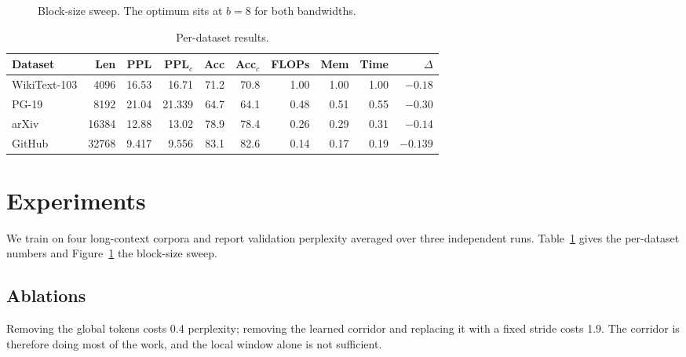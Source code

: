 \documentclass[11pt,twocolumn]{article}
\begin{document}
\begin{figure}[t]
\centering
{}
\caption{Block-size sweep. The optimum sits at $b=8$ for both bandwidths.}
\label{fig:sweep}
\end{figure}

\begin{table}[t]
\centering
\caption{Per-dataset results.}
\label{tab:results}
\begin{tabular}{lrrrrrrrrr}
\toprule
Dataset & Len & PPL & PPL$_c$ & Acc & Acc$_c$ & FLOPs & Mem & Time & $\Delta$ \\
\midrule
WikiText-103 & 4096 & 16.53 & 16.71 & 71.2 & 70.8 & 1.00 & 1.00 & 1.00 & $-0.18$ \\
PG-19        & 8192 & 21.04 & 21.339 & 64.7 & 64.1 & 0.48 & 0.51 & 0.55 & $-0.30$ \\
arXiv        & 16384 & 12.88 & 13.02 & 78.9 & 78.4 & 0.26 & 0.29 & 0.31 & $-0.14$ \\
GitHub       & 32768 & 9.417 & 9.556 & 83.1 & 82.6 & 0.14 & 0.17 & 0.19 & $-0.139$ \\
\bottomrule
\end{tabular}
\end{table}

\section{Experiments}
\label{sec:exp}
We train on four long-context corpora and report validation perplexity averaged
over three independent runs. Table~\ref{tab:results} gives the per-dataset
numbers and Figure~\ref{fig:sweep} the block-size sweep.

\subsection{Ablations}
Removing the global tokens costs 0.4 perplexity; removing the learned corridor
and replacing it with a fixed stride costs 1.9. The corridor is therefore doing
most of the work, and the local window alone is not sufficient.
\end{document}
